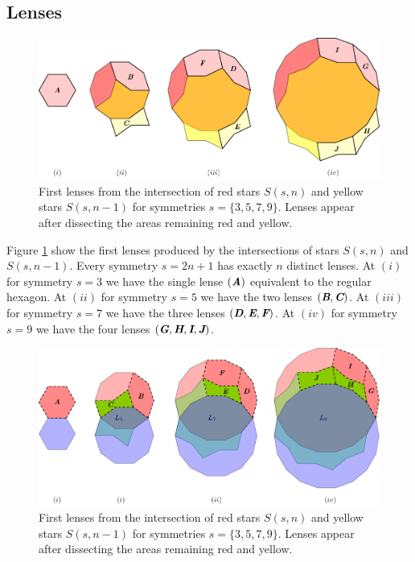 \documentclass[11pt]{article}
\def\mathbi#1{\textbf{\em #1}}
\begin{document}
\subsection{Lenses}

\begin{figure}[H]
\centering
\includegraphics[scale=1]{stars/inter-1}
\caption{First lenses from the intersection of red stars $S(s,n)$ and yellow stars $S(s,n-1)$ for symmetries $s=\{3,5,7,9\}$. Lenses appear after dissecting the areas remaining red and yellow.}
\label{fig:stars-inter-1}
\end{figure}

Figure \ref{fig:stars-inter-1} show the first lenses produced by the intersections of stars $S(s,n)$ and $S(s,n-1)$. Every symmetry $s=2n+1$ has exactly $n$ distinct lenses. At $(i)$ for symmetry $s=3$ we have the single lense $(\mathbi{A})$ equivalent to the regular hexagon. At $(ii)$ for symmetry $s=5$ we have the two lenses $(\mathbi{B},\mathbi{C})$. At $(iii)$ for symmetry $s=7$ we have the three lenses $(\mathbi{D},\mathbi{E},\mathbi{F})$. At $(iv)$ for symmetry $s=9$ we have the four lenses $(\mathbi{G},\mathbi{H},\mathbi{I},\mathbi{J})$.

\begin{figure}[H]
\centering
\includegraphics[scale=1]{stars/inter-2}
\caption{First lenses from the intersection of red stars $S(s,n)$ and yellow stars $S(s,n-1)$ for symmetries $s=\{3,5,7,9\}$. Lenses appear after dissecting the areas remaining red and yellow.}
\label{fig:stars-inter-2}
\end{figure}
\end{document}

